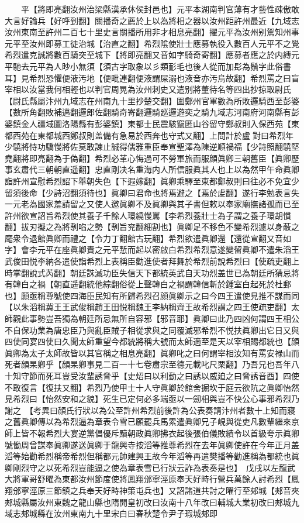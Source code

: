 　　平【將即亮翻汝州治梁縣漢承休侯封邑也】元平本湖南判官薄有才藝性疎傲敢大言好論兵【好呼到翻】關播奇之薦於上以為將相之器以汝州距許州最近【九域志汝州東南至許州二百七十里史言關播所用非才相息亮翻】擢元平為汝州别駕知州事元平至汝州即募工徒治城【治直之翻】希烈隂使壯士應募執役入數百人元平不之覺希烈遣克誠將數百騎突至城下【將即亮翻又音如字騎奇寄翻】應募者應之於内縳元平馳去元平為人眇小無須【須古字取象以彡類耏毛也後人從而加髟為鬚字此俗書耳】見希烈恐懼便液汚地【便毗連翻便液謂屎溺也液音亦汚烏故翻】希烈罵之曰盲宰相以汝當我何相輕也以判官周晃為汝州刺史又遣别將董待名等四出抄掠取尉氏【尉氏縣屬汴州九域志在州南九十里抄楚交翻】圍鄭州官軍數為所敗邏騎西至彭婆【數所角翻敗補邁翻邏郎佐翻騎奇寄翻邏騎廵邏遊奕之騎九域志河南府河南縣有彭婆鎮金人疆域圖洛陽縣有彭婆鎮】東都士民震駭竄匿山谷留守鄭叔則入保西苑【東都西苑在東都城西鄭叔則盖備有急易於西奔也守式又翻】上問計於盧對曰希烈年少驍將恃功驕慢將佐莫敢諫止誠得儒雅重臣奉宣聖澤為陳逆順禍福【少詩照翻驍堅堯翻將即亮翻為于偽翻】希烈必革心悔過可不勞軍旅而服顔眞卿三朝舊臣【眞卿歷事玄肅代三朝朝直遥翻】忠直剛决名重海内人所信服眞其人也上以為然甲午命眞卿詣許州宣慰希烈詔下舉朝失色【下遐嫁翻】眞卿乘驛至東都鄭叔則曰往必不免宜少留須後命【少詩沼翻須待也】眞卿曰君命也將焉避之【焉於䖍翻】遂行李勉表言失一元老為國家羞請留之又使人邀眞卿不及眞卿與其子書但敕以奉家廟撫諸孤而已至許州欲宣詔旨希烈使其養子千餘人環繞慢罵【李希烈養壯士為子謂之養子環胡慣翻】拔刃擬之為將剸啗之勢【剸旨兖翻細割也】眞卿足不移色不變希烈遽以身蔽之麾衆令退館眞卿而禮之【令力丁翻館古玩翻】希烈欲遣眞卿還【還從宣翻又音如字】會李元平在座眞卿責之元平慙而起以密啟白希烈希烈意遂變留眞卿不遣朱滔王武俊田悦李納各遣使詣希烈上表稱臣勸進使者拜舞於希烈前說希烈曰【使疏吏翻上時掌翻說式芮翻】朝廷誅滅功臣失信天下都統英武自天功烈盖世已為朝廷所猜忌將有韓白之禍【朝直遥翻統他綜翻俗從上聲韓白之禍謂韓信斬於鍾室白起死於杜郵也】願亟稱尊號使四海臣民知有所歸希烈召顔眞卿示之曰今四王遣使見推不謀而同【以朱滔稱冀王王武俊稱趙王田悦稱魏王李納稱齊王故希烈謂之四王使疏吏翻】太師觀此事勢豈吾獨為朝廷所忌無所自容邪【邪音耶】眞卿曰此乃四凶何謂四王相公不自保功業為唐忠臣乃與亂臣賊子相從求與之同覆滅邪希烈不悦扶眞卿出它日又與四使同宴四使曰久聞太師重望今都統將稱大號而太師適至是天以宰相賜都統也【顔眞卿為太子太師故皆以其官稱之相息亮翻】眞卿叱之曰何謂宰相汝知有罵安禄山而死者顔杲卿乎【顔杲卿事見二百一十七卷肅宗至德元載叱尺栗翻】乃吾兄也吾年八十知守節而死耳豈受汝輩誘脅乎【史炤曰以利動之曰誘以威廹之曰脅誘音酉】四使不敢復言【復扶又翻】希烈乃使甲士十人守眞卿於館舍掘坎于庭云欲阬之眞卿怡然見希烈曰【怡然安和之貌】死生已定何必多端亟以一劒相與豈不快公心事邪希烈乃謝之　【考異曰顔氏行狀以為公至許州希烈前後許為公表奏請汴州者數十上知而寢之舊眞卿傳以為希烈逼為章表令雪已願罷兵馬累遣眞卿兄子峴與從吏凡數輩繼來京師上皆不報希烈大宴逆黨倡優斥黷朝政眞卿拂衣起後張伯儀敗績令以首級夸示眞卿號慟周曾謀奉眞卿遂送眞卿于龍興寺按滔等推尊希烈在去年眞卿使許在今年正月盖滔等始勸希烈稱帝希烈但稱都元帥建興王故今年滔等再遣樊播等勸進稱為都統也眞卿剛烈守之以死希烈豈能逼之使為章表雪已行狀云詐為表奏是也】　戊戌以左龍武大將軍哥舒曜為東都汝州節度使將鳳翔邠寧涇原奉天好畤行營兵萬餘人討希烈【鳳翔邠寧涇原三節鎮之兵奉天好畤神策屯兵也】又詔諸道共討之曜行至郟城【郟音夾郟城縣屬汝州東魏之龍山縣也隋開皇初改曰汝南十八年改曰輔城大業初改曰郟城九域志郟城縣在汝州東南九十里宋白曰春秋楚令尹子瑕城郟即